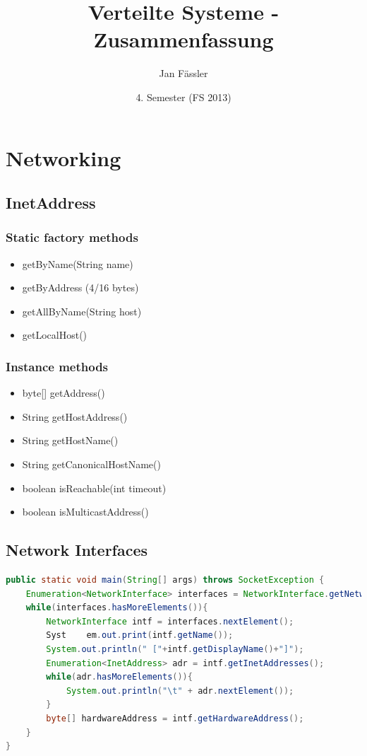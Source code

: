 \documentclass[10pt]{article}
\title{
	\vspace{5cm}
	Verteilte Systeme - Zusammenfassung
}
\author{Jan Fässler}
\date{4. Semester (FS 2013)}
\begin{document}
\maketitle
\thispagestyle{fancy}

\newpage

\tableofcontents	  	


\newpage
\setcounter{page}{1}


\section{Networking}
\subsection{InetAddress}
\subsubsection*{Static factory methods}
\begin{itemize}
	\item getByName(String name)
	\item getByAddress (4/16 bytes)
	\item getAllByName(String host)
	\item getLocalHost()
\end{itemize}
\subsubsection*{Instance methods}
\begin{itemize}
	\item byte[] getAddress()
	\item String getHostAddress()
	\item String getHostName()
	\item String getCanonicalHostName()
	\item boolean isReachable(int timeout)
	\item boolean isMulticastAddress()
\end{itemize}
\subsection{Network Interfaces}
\begin{lstlisting}[language=Java, caption=Network Interfaces and its addresses, style=JavaStyle]
public static void main(String[] args) throws SocketException {
	Enumeration<NetworkInterface> interfaces = NetworkInterface.getNetworkInterfaces();
	while(interfaces.hasMoreElements()){
		NetworkInterface intf = interfaces.nextElement();
		Syst	em.out.print(intf.getName());
		System.out.println(" ["+intf.getDisplayName()+"]");
		Enumeration<InetAddress> adr = intf.getInetAddresses();
		while(adr.hasMoreElements()){
			System.out.println("\t" + adr.nextElement());
		}
		byte[] hardwareAddress = intf.getHardwareAddress();
	}
}
\end{lstlisting}
\end{document}
